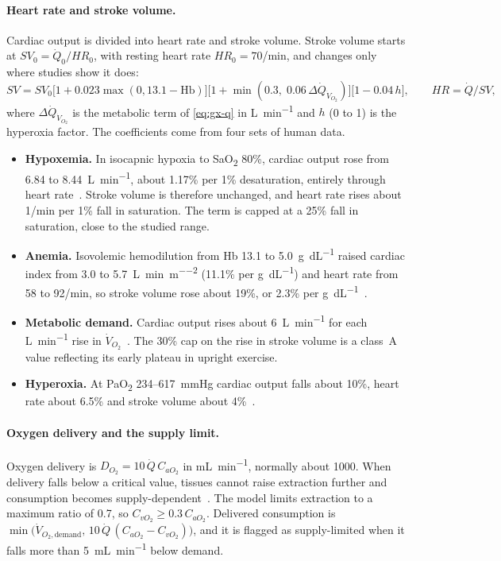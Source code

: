 \paragraph{Heart rate and stroke volume.} Cardiac output is divided into heart rate and stroke volume. Stroke volume starts at $SV_0=\dot Q_0/HR_0$, with resting heart rate $HR_0=70$/min, and changes only where studies show it does:
\begin{equation}
SV=SV_0\bigl[1+0.023\max(0,13.1-\mathrm{Hb})\bigr]\bigl[1+\min(0.3,\;0.06\,\Delta\dot Q_{\dot V_{O_2}})\bigr]\bigl[1-0.04\,h\bigr],\qquad HR=\dot Q/SV,
\label{eq:gx-sv}
\end{equation}
where $\Delta\dot Q_{\dot V_{O_2}}$ is the metabolic term of \cref{eq:gx-q} in \si{\liter\per\minute} and $h$ (0 to 1) is the hyperoxia factor. The coefficients come from four sets of human data.
\begin{itemize}[leftmargin=*]
\item \textbf{Hypoxemia.} In isocapnic hypoxia to SaO\textsubscript{2} 80\%, cardiac output rose from 6.84 to \SI{8.44}{\liter\per\minute}, about 1.17\% per 1\% desaturation, entirely through heart rate~\citep{phillips1988}. Stroke volume is therefore unchanged, and heart rate rises about 1/min per 1\% fall in saturation. The term is capped at a 25\% fall in saturation, close to the studied range.
\item \textbf{Anemia.} Isovolemic hemodilution from Hb 13.1 to \SI{5.0}{\gram\per\deci\liter} raised cardiac index from 3.0 to \SI{5.7}{\liter\per\minute\per\square\meter} (11.1\% per \si{\gram\per\deci\liter}) and heart rate from 58 to 92/min, so stroke volume rose about 19\%, or 2.3\% per \si{\gram\per\deci\liter}~\citep{weiskopf1998}.
\item \textbf{Metabolic demand.} Cardiac output rises about \SI{6}{\liter\per\minute} for each \si{\liter\per\minute} rise in $\dot V_{O_2}$~\citep{joyner2021}. The 30\% cap on the rise in stroke volume is a class~A value reflecting its early plateau in upright exercise.
\item \textbf{Hyperoxia.} At PaO\textsubscript{2} 234--\SI{617}{\mmHg} cardiac output falls about 10\%, heart rate about 6.5\% and stroke volume about 4\%~\citep{smit2018}.
\end{itemize}

\paragraph{Oxygen delivery and the supply limit.} Oxygen delivery is $D_{O_2}=10\,\dot Q\,C_{aO_2}$ in \si{\milli\liter\per\minute}, normally about 1000. When delivery falls below a critical value, tissues cannot raise extraction further and consumption becomes supply-dependent~\citep{schumacker1987}. The model limits extraction to a maximum ratio of 0.7, so $C_{vO_2}\geq0.3\,C_{aO_2}$. Delivered consumption is $\min\bigl(\dot V_{O_2,\mathrm{demand}},\,10\,\dot Q\,(C_{aO_2}-C_{vO_2})\bigr)$, and it is flagged as supply-limited when it falls more than \SI{5}{\milli\liter\per\minute} below demand.

